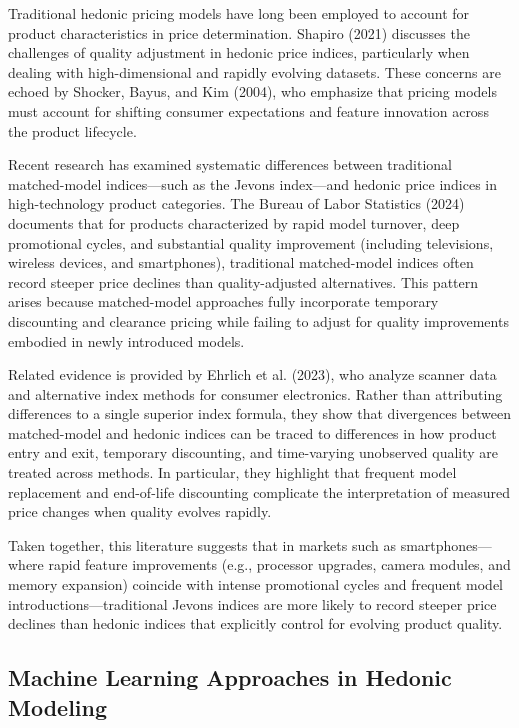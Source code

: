 \documentclass[12pt]{article}
\begin{document}
Traditional hedonic pricing models have long been employed to account for product characteristics in price determination. Shapiro (2021) discusses the challenges of quality adjustment in hedonic price indices, particularly when dealing with high-dimensional and rapidly evolving datasets. These concerns are echoed by Shocker, Bayus, and Kim (2004), who emphasize that pricing models must account for shifting consumer expectations and feature innovation across the product lifecycle.

Recent research has examined systematic differences between traditional matched-model indices—such as the Jevons index—and hedonic price indices in high-technology product categories. The Bureau of Labor Statistics (2024) documents that for products characterized by rapid model turnover, deep promotional cycles, and substantial quality improvement (including televisions, wireless devices, and smartphones), traditional matched-model indices often record steeper price declines than quality-adjusted alternatives. This pattern arises because matched-model approaches fully incorporate temporary discounting and clearance pricing while failing to adjust for quality improvements embodied in newly introduced models.

Related evidence is provided by Ehrlich et al. (2023), who analyze scanner data and alternative index methods for consumer electronics. Rather than attributing differences to a single superior index formula, they show that divergences between matched-model and hedonic indices can be traced to differences in how product entry and exit, temporary discounting, and time-varying unobserved quality are treated across methods. In particular, they highlight that frequent model replacement and end-of-life discounting complicate the interpretation of measured price changes when quality evolves rapidly.

Taken together, this literature suggests that in markets such as smartphones—where rapid feature improvements (e.g., processor upgrades, camera modules, and memory expansion) coincide with intense promotional cycles and frequent model introductions—traditional Jevons indices are more likely to record steeper price declines than hedonic indices that explicitly control for evolving product quality.


\subsection*{Machine Learning Approaches in Hedonic Modeling}
\end{document}
